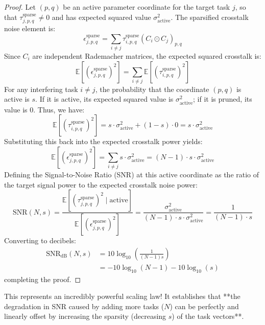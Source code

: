 \documentclass{article}
\begin{document}
\begin{proof}
Let $(p, q)$ be an active parameter coordinate for the target task $j$, so that $\tau^{\text{sparse}}_{j, p, q} \neq 0$ and has expected squared value $\sigma^2_{\text{active}}$.
The sparsified crosstalk noise element is:
\begin{equation}
    \epsilon^{\text{sparse}}_{j, p, q} = \sum_{i \neq j} \tau^{\text{sparse}}_{i, p, q} (C_i \odot C_j)_{p, q}
\end{equation}
Since $C_i$ are independent Rademacher matrices, the expected squared crosstalk is:
\begin{equation}
    \mathbb{E}[(\epsilon^{\text{sparse}}_{j, p, q})^2] = \sum_{i \neq j} \mathbb{E}[(\tau^{\text{sparse}}_{i, p, q})^2]
\end{equation}
For any interfering task $i \neq j$, the probability that the coordinate $(p, q)$ is active is $s$. If it is active, its expected squared value is $\sigma^2_{\text{active}}$; if it is pruned, its value is 0. Thus, we have:
\begin{equation}
    \mathbb{E}[(\tau^{\text{sparse}}_{i, p, q})^2] = s \cdot \sigma^2_{\text{active}} + (1 - s) \cdot 0 = s \cdot \sigma^2_{\text{active}}
\end{equation}
Substituting this back into the expected crosstalk power yields:
\begin{equation}
    \mathbb{E}[(\epsilon^{\text{sparse}}_{j, p, q})^2] = \sum_{i \neq j} s \cdot \sigma^2_{\text{active}} = (N - 1) \cdot s \cdot \sigma^2_{\text{active}}
\end{equation}
Defining the Signal-to-Noise Ratio (SNR) at this active coordinate as the ratio of the target signal power to the expected crosstalk noise power:
\begin{equation}
    \text{SNR}(N, s) = \frac{\mathbb{E}[(\tau^{\text{sparse}}_{j, p, q})^2 \mid \text{active}]}{\mathbb{E}[(\epsilon^{\text{sparse}}_{j, p, q})^2]} = \frac{\sigma^2_{\text{active}}}{(N - 1) \cdot s \cdot \sigma^2_{\text{active}}} = \frac{1}{(N - 1) \cdot s}
\end{equation}
Converting to decibels:
\begin{align*}
    \text{SNR}_{\text{dB}}(N, s) &= 10 \log_{10}\left( \frac{1}{(N-1)s} \right) \\
    &= -10 \log_{10}(N - 1) - 10 \log_{10}(s)
\end{align*}
completing the proof.
\end{proof}

This represents an incredibly powerful scaling law! It establishes that **the degradation in SNR caused by adding more tasks ($N$) can be perfectly and linearly offset by increasing the sparsity (decreasing $s$) of the task vectors**. 
\end{document}
